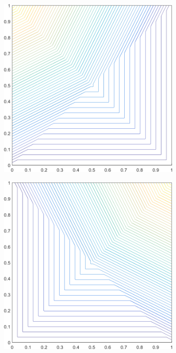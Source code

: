 \begin{figure}
\centering
	\begin{subfigure}[b]{0.39\textwidth}
		\centering
		\includegraphics[width=\textwidth]{figures/sec_BF/square_PWLD1_contour_b4.png}
		\caption{}
	\end{subfigure}
	\hspace{1.5cm}
	\begin{subfigure}[b]{0.39\textwidth}
		\centering
		\includegraphics[width=\textwidth]{figures/sec_BF/square_PWLD1_contour_b3.png}

\end{subfigure}
\end{figure}

